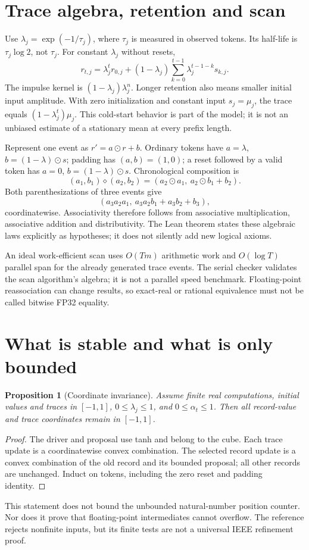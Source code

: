 \documentclass[11pt,a4paper]{article}
\newtheorem{proposition}{Proposition}
\begin{document}
\section{Trace algebra, retention and scan}
Use \(\lambda_j=\exp(-1/\tau_j)\), where \(\tau_j\) is measured in observed
tokens. Its half-life is \(\tau_j\log 2\), not \(\tau_j\). For constant
\(\lambda_j\) without resets,
\begin{equation}
r_{t,j}=\lambda_j^t r_{0,j}
 +(1-\lambda_j)\sum_{k=0}^{t-1}\lambda_j^{t-1-k}s_{k,j}.
\end{equation}
The impulse kernel is \((1-\lambda_j)\lambda_j^n\). Longer retention also
means smaller initial input amplitude. With zero initialization and constant
input \(s_j=\mu_j\), the trace equals
\((1-\lambda_j^t)\mu_j\). This cold-start behavior is part of the model; it
is not an unbiased estimate of a stationary mean at every prefix length.

Represent one event as \(r' = a\odot r+b\). Ordinary tokens have
\(a=\lambda\), \(b=(1-\lambda)\odot s\); padding has \((a,b)=(1,0)\);
a reset followed by a valid token has \(a=0\), \(b=(1-\lambda)\odot s\).
Chronological composition is
\begin{equation}
(a_1,b_1)\diamond(a_2,b_2)
=(a_2\odot a_1,\ a_2\odot b_1+b_2).
\end{equation}
Both parenthesizations of three events give
\[
(a_3a_2a_1,\ a_3a_2b_1+a_3b_2+b_3),
\]
coordinatewise. Associativity therefore follows from associative multiplication,
associative addition and distributivity. The Lean theorem states these algebraic
laws explicitly as hypotheses; it does not silently add new logical axioms.

An ideal work-efficient scan uses \(O(Tm)\) arithmetic work and \(O(\log T)\)
parallel span for the already generated trace events. The serial checker
validates the scan algorithm's algebra; it is not a parallel speed benchmark.
Floating-point reassociation can change results, so exact-real or rational
equivalence must not be called bitwise FP32 equality.

\section{What is stable and what is only bounded}
\begin{proposition}[Coordinate invariance]
Assume finite real computations, initial values and traces in \([-1,1]\),
\(0\le\lambda_j\le1\), and \(0\le\alpha_t\le1\). Then all record-value
and trace coordinates remain in \([-1,1]\).
\end{proposition}
\begin{proof}
The driver and proposal use tanh and belong to the cube. Each trace update is
a coordinatewise convex combination. The selected record update is a convex
combination of the old record and its bounded proposal; all other records are
unchanged. Induct on tokens, including the zero reset and padding identity.
\end{proof}
This statement does not bound the unbounded natural-number position counter.
Nor does it prove that floating-point intermediates cannot overflow. The
reference rejects nonfinite inputs, but its finite tests are not a universal
IEEE refinement proof.
\end{document}
